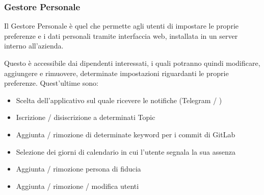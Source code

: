 		
	
	\subsubsection{Gestore Personale}\label{TecnologieGestorePersonale}
	Il Gestore Personale è quel  che permette agli utenti di impostare le
	proprie preferenze e i dati personali tramite interfaccia web, installata in un server
	interno all'azienda.

	Questo è accessibile dai dipendenti interessati, i quali potranno quindi modificare, aggiungere e rimuovere, determinate impostazioni riguardanti le proprie
	preferenze. Quest'ultime sono:
	\begin{itemize}
		\item Scelta dell'applicativo sul quale ricevere le notifiche (Telegram / \mail)
		\item Iscrizione / disiscrizione a determinati Topic
		\item Aggiunta / rimozione di determinate keyword per i commit di GitLab
		\item Selezione dei giorni di calendario in cui l'utente segnala la sua assenza
		\item Aggiunta / rimozione persona di fiducia
		\item Aggiunta / rimozione / modifica utenti
	\end{itemize}

